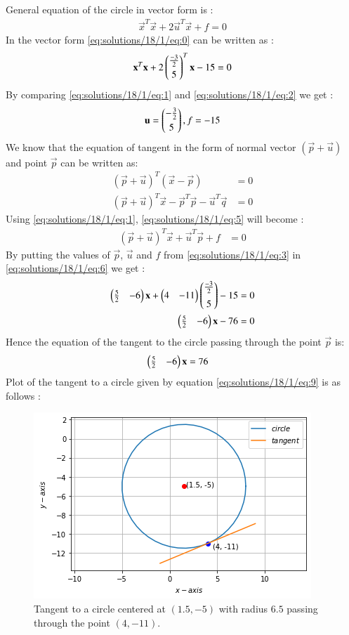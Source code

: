 

General equation of the circle in vector form is :
\begin{align}
\vec{x}^T\vec{x}+2\vec{u}^T\vec{x}+f=0\label{eq:solutions/18/1/eq:1}
\end{align}
In the vector form \eqref{eq:solutions/18/1/eq:0} can be written as :
\begin{align}
\mathbf{x}^T\mathbf{x}+2\begin{pmatrix}\frac{-3}{2}\\[0.1 cm]5\end{pmatrix}^T\mathbf{x}-15=0\label{eq:solutions/18/1/eq:2}
\end{align}
By comparing \eqref{eq:solutions/18/1/eq:1} and \eqref{eq:solutions/18/1/eq:2} we get : 
\begin{align}
    \mathbf{u}=\begin{pmatrix}-\frac{3}{2}\\[0.1 cm]5\end{pmatrix},f=-15\label{eq:solutions/18/1/eq:3}
\end{align}
We know that the equation of tangent in the form of normal vector $(\vec{p}+\vec{u})$ and point $\vec{p}$ can be written as:
\begin{align}
    (\vec{p}+\vec{u})^T(\vec{x}-\vec{p})&=0\\
    (\vec{p}+\vec{u})^T\vec{x}-\vec{p}^T\vec{p}-\vec{u}^T\vec{q}&=0\label{eq:solutions/18/1/eq:5}
\end{align}
Using \eqref{eq:solutions/18/1/eq:1}, \eqref{eq:solutions/18/1/eq:5} will become : 
\begin{align}
    (\vec{p}+\vec{u})^T\vec{x}+\vec{u}^T\vec{p}+f&=0\label{eq:solutions/18/1/eq:6}
\end{align}
By putting the values of $\vec{p}$, $\vec{u}$ and $f$ from \eqref{eq:solutions/18/1/eq:3} in \eqref{eq:solutions/18/1/eq:6} we get : 
\begin{align}
    \begin{pmatrix}\frac{5}{2}&-6\end{pmatrix}\mathbf{x}+\begin{pmatrix}4&-11\end{pmatrix}\begin{pmatrix}\frac{-3}{2}\\[0.2cm]5\end{pmatrix}-15&=0\\
    \begin{pmatrix}\frac{5}{2}&-6\end{pmatrix}\mathbf{x}-76&=0
\end{align}
Hence the equation of the tangent to the circle passing through the point $\vec{p}$ is:
\begin{align}
    \begin{pmatrix}\frac{5}{2}&-6\end{pmatrix}\mathbf{x}&=76\label{eq:solutions/18/1/eq:9}
\end{align}
Plot of the tangent to a circle given by equation \eqref{eq:solutions/18/1/eq:9} is as follows :
\begin{figure}[h]
\centering
    \includegraphics[width=\columnwidth]{solutions/18/1/tangent.png}
    \caption{Tangent to a circle centered at $(1.5, -5)$ with radius $6.5$ passing through the point $(4,-11)$.}
    \label{eq:solutions/18/1/tangent}
\end{figure}

